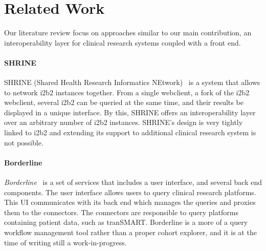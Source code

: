 \section{Related Work}

Our literature review focus on approaches similar to our main contribution, an interoperability layer for clinical research systems coupled with a front end.


\paragraph{SHRINE}

SHRINE (Shared Health Research Informatics NEtwork)~\cite{shrine} is a system that allows to network i2b2 instances together.
From a single webclient, a fork of the i2b2 webclient, several i2b2 can be queried at the same time, and their results be displayed in a unique interface.
By this, SHRINE offers an interoperability layer over an arbitrary number of i2b2 instances.
SHRINE's design is very tightly linked to i2b2 and extending its support to additional clinical research system is not possible.


\paragraph{Borderline}

\emph{Borderline}~\cite{borderline} is a set of services that includes a user interface, and several back end components.
The user interface allows users to query clinical research platforms.
This UI communicates with its back end which manages the queries and proxies them to the connectors.
The connectors are responsible to query platforms containing patient data, such as tranSMART.
Borderline is a more of a query workflow management tool rather than a proper cohort explorer, and it is at the time of writing still a work-in-progress.










